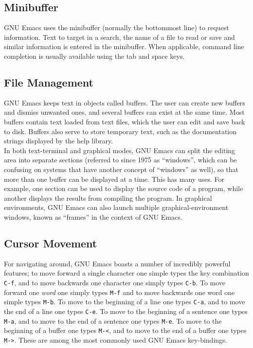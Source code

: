 \documentclass[12pt,a4paper,oneside]{article}
\begin{document}
\subsection{Minibuffer}
GNU Emacs uses the minibuffer (normally the bottommost line) to request information. Text to target in a search, the name of a file to read or save and similar information is entered in the minibuffer. When applicable, command line completion is usually available using the tab and space keys.

\subsection{File Management}
GNU Emacs keeps text in objects called buffers. The user can create new buffers and dismiss unwanted ones, and several buffers can exist at the same time. Most buffers contain text loaded from text files, which the user can edit and save back to disk. Buffers also serve to store temporary text, such as the documentation strings displayed by the help library.\\

In both text-terminal and graphical modes, GNU Emacs can split the editing area into separate sections (referred to since 1975 as ``windows'', which can be confusing on systems that have another concept of ``windows'' as well), so that more than one buffer can be displayed at a time. This has many uses. For example, one section can be used to display the source code of a program, while another displays the results from compiling the program. In graphical environments, GNU Emacs can also launch multiple graphical-environment windows, known as ``frames'' in the context of GNU Emacs.

\subsection{Cursor Movement}
For navigating around, GNU Emacs boasts a number of incredibly powerful features; to move forward a single character one simple types the key combination \texttt{C-f}, and to move backwards one character one simply types \texttt{C-b}.  To move forward one \emph{word} one simply types \texttt{M-f} and to move backwards one word one simple types \texttt{M-b}.  To move to the beginning of a line one types \texttt{C-a}, and to move the end of a line one types \texttt{C-e}.  To move to the beginning of a sentence one types \texttt{M-a}, and to move to the end of a sentence one types \texttt{M-e}. To move to the beginning of a buffer one types \texttt{M-<}, and to move to the end of a buffer one types \texttt{M->}.  These are among the most commonly used GNU Emacs key-bindings.\\
\end{document}
